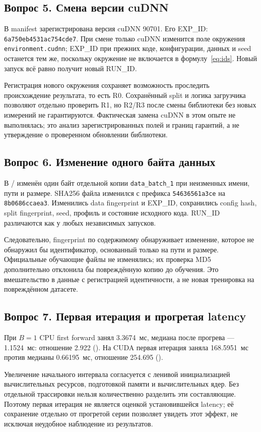 \subsection{Вопрос 5. Смена версии cuDNN}\label{cf:5}
В manifest  зарегистрирована версия cuDNN 90701. Его EXP\_ID: \nolinkurl{6a750eb4531ac754cde7}. При смене только cuDNN изменится поле окружения \nolinkurl{environment.cudnn}; EXP\_ID при прежних коде, конфигурации, данных и seed останется тем же, поскольку окружение не включается в формулу~\eqref{eq:ids}. Новый запуск всё равно получит новый RUN\_ID.

Регистрация нового окружения сохраняет возможность проследить происхождение результата, то есть R0. Сохранённый split и логика загрузчика позволяют отдельно проверить R1, но R2/R3 после смены библиотеки без новых измерений не гарантируются. Фактическая замена cuDNN в этом опыте не выполнялась; это анализ зарегистрированных полей и границ гарантий, а не утверждение о проверенном обновлении библиотеки.

\subsection{Вопрос 6. Изменение одного байта данных}\label{cf:6}
В / изменён один байт отдельной копии \texttt{data\_batch\_1} при неизменных имени, пути и размере. SHA256 файла изменился с префикса \texttt{54636561a3ce} на \texttt{8b0686ccaea3}. Изменились data fingerprint и EXP\_ID, сохранились config hash, split fingerprint, seed, профиль и состояние исходного кода. RUN\_ID различаются как у любых независимых запусков.

Следовательно, fingerprint по содержимому обнаруживает изменение, которое не обнаружил бы идентификатор, основанный только на пути и размере. Официальные обучающие файлы не изменялись; их проверка MD5 дополнительно отклонила бы повреждённую копию до обучения. Это вмешательство в данные с регистрацией идентичности, а не новая тренировка на повреждённом датасете.

\subsection{Вопрос 7. Первая итерация и прогретая latency}\label{cf:7}
При $B=1$ CPU first forward занял 3.3674~мс, медиана после прогрева --- 1.1524~мс: отношение 2.922 (). На CUDA первая итерация заняла 168.5951~мс против медианы 0.66195~мс, отношение 254.695 ().

Увеличение начального интервала согласуется с ленивой инициализацией вычислительных ресурсов, подготовкой памяти и вычислительных ядер. Без отдельной трассировки нельзя количественно разделить эти составляющие. Поэтому первая итерация не является оценкой установившейся latency; её сохранение отдельно от прогретой серии позволяет увидеть этот эффект, не исключая неудобное наблюдение из результатов.

